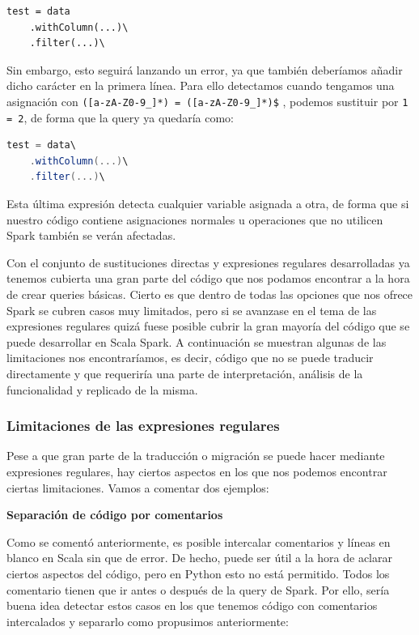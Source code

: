\documentclass[12pt,twoside,titlepage]{report}
\begin{document}
\begin{lstlisting}
test = data
	.withColumn(...)\
	.filter(...)\
\end{lstlisting}

Sin embargo, esto seguirá lanzando un error, ya que también deberíamos añadir dicho carácter en la primera línea. Para ello detectamos cuando tengamos una asignación con \texttt{([a-zA-Z0-9\_]*) = ([a-zA-Z0-9\_]*)\$}
, podemos sustituir por \texttt{1 = 2}, de forma que la query ya quedaría como:

\begin{lstlisting}[language=scala]
test = data\
	.withColumn(...)\
	.filter(...)\
\end{lstlisting}

Esta última expresión detecta cualquier variable asignada a otra, de forma que si nuestro código contiene asignaciones normales u operaciones que no utilicen Spark también se verán afectadas.

Con el conjunto de sustituciones directas y expresiones regulares desarrolladas ya tenemos cubierta una gran parte del código que nos podamos encontrar a la hora de crear queries básicas. Cierto es que dentro de todas las opciones que nos ofrece Spark se cubren casos muy limitados, pero si se avanzase en el tema de las expresiones regulares quizá fuese posible cubrir la gran mayoría del código que se puede desarrollar en Scala Spark. A continuación se muestran algunas de las limitaciones nos encontraríamos, es decir, código que no se puede traducir directamente y que requeriría una parte de interpretación, análisis de la funcionalidad y replicado de la misma.




\subsubsection{Limitaciones de las expresiones regulares}

Pese a que gran parte de la traducción o migración se puede hacer mediante expresiones regulares, hay ciertos aspectos en los que nos podemos encontrar ciertas limitaciones. Vamos a comentar dos ejemplos:

\textbf{Separación de código por comentarios}

Como se comentó anteriormente, es posible intercalar comentarios y líneas en blanco en Scala sin que de error. De hecho, puede ser útil a la hora de aclarar ciertos aspectos del código, pero en Python esto no está permitido. Todos los comentario tienen que ir antes o después de la query de Spark. Por ello, sería buena idea detectar estos casos en los que tenemos código con comentarios intercalados y separarlo como propusimos anteriormente:
\end{document}
